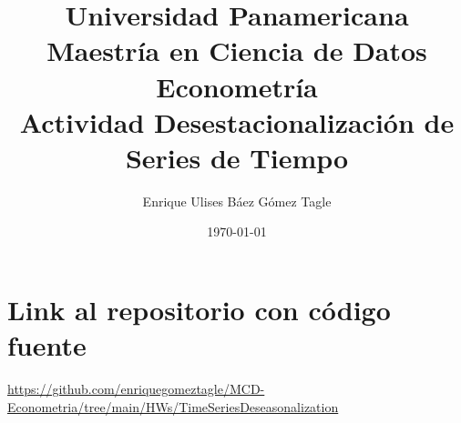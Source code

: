 \documentclass[10pt]{article}
\title{Universidad Panamericana \\ Maestría en Ciencia de Datos 
\\ Econometría \\ \vspace{0.5cm} Actividad Desestacionalización de Series de Tiempo}
\author{Enrique Ulises Báez Gómez Tagle}
\date{\today}
\begin{document}
\maketitle

\tableofcontents

\newpage


\section{Link al repositorio con código fuente}
\href{https://github.com/enriquegomeztagle/MCD-Econometria/tree/main/HWs/TimeSeriesDeseasonalization}{https://github.com/enriquegomeztagle/MCD-Econometria/tree/main/HWs/TimeSeriesDeseasonalization}
\end{document}
